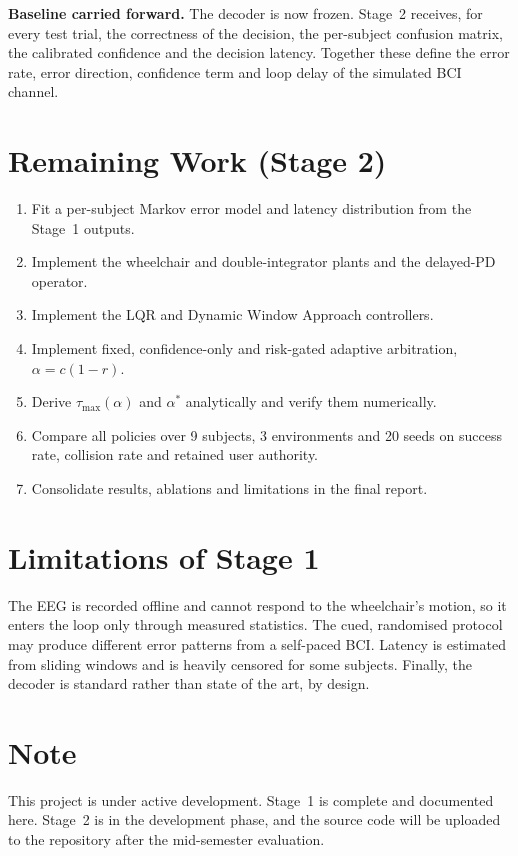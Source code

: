 \documentclass[11pt,a4paper]{article}
\begin{document}
\textbf{Baseline carried forward.} The decoder is now frozen. Stage~2 receives,
for every test trial, the correctness of the decision, the per-subject confusion
matrix, the calibrated confidence and the decision latency. Together these
define the error rate, error direction, confidence term and loop delay of the
simulated BCI channel.

\section{Remaining Work (Stage 2)}

\begin{enumerate}
  \item Fit a per-subject Markov error model and latency distribution from the Stage~1 outputs.
  \item Implement the wheelchair and double-integrator plants and the delayed-PD operator.
  \item Implement the LQR and Dynamic Window Approach controllers.
  \item Implement fixed, confidence-only and risk-gated adaptive arbitration, $\alpha = c(1-r)$.
  \item Derive $\tau_{\max}(\alpha)$ and $\alpha^*$ analytically and verify them numerically.
  \item Compare all policies over 9 subjects, 3 environments and 20 seeds on success rate, collision rate and retained user authority.
  \item Consolidate results, ablations and limitations in the final report.
\end{enumerate}

\section{Limitations of Stage 1}

The EEG is recorded offline and cannot respond to the wheelchair's motion, so it
enters the loop only through measured statistics. The cued, randomised protocol
may produce different error patterns from a self-paced BCI. Latency is estimated
from sliding windows and is heavily censored for some subjects. Finally, the
decoder is standard rather than state of the art, by design.

\section{Note}

This project is under active development. Stage~1 is complete and documented
here. Stage~2 is in the development phase, and the source code will be uploaded
to the repository after the mid-semester evaluation.
\end{document}

